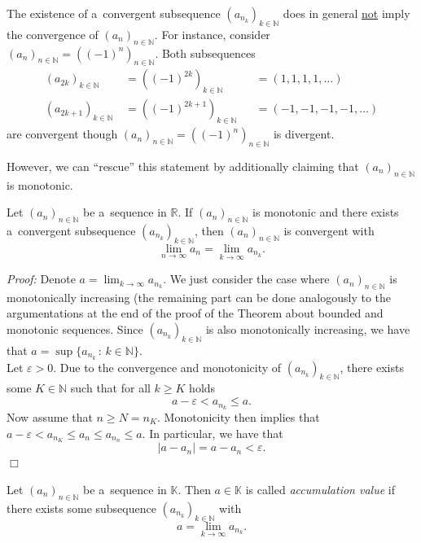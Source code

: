\begin{Attention}{}
The existence of a~convergent subsequence $(a_{n_k})_{k\in\mathbb{N}}$ does in general \underline{not} imply the convergence of $(a_n)_{n\in\mathbb{N}}$. For instance, consider $(a_n)_{n\in\mathbb{N}}=((-1)^n)_{n\in\mathbb{N}}$. Both subsequences
\[\begin{aligned}
(a_{2k})_{k\in\mathbb{N}}\,&=((-1)^{2k})_{k\in\mathbb{N}}&&=(1,1,1,1,\ldots)\\
(a_{2k+1})_{k\in\mathbb{N}}\,&=((-1)^{2k+1})_{k\in\mathbb{N}}\!\!\!\!\!\!&&=(-1,-1,-1,-1,\ldots)
  \end{aligned}
\]
 are convergent though $(a_n)_{n\in\mathbb{N}}=((-1)^n)_{n\in\mathbb{N}}$ is divergent.
\end{Attention}
However, we can ``rescue'' this statement by additionally claiming that $(a_n)_{n\in\mathbb{N}}$ is monotonic.

\begin{Theorem}
\label{thm:submon}
Let $(a_n)_{n\in\mathbb{N}}$ be a~sequence in $\mathbb{R}$. If $(a_n)_{n\in\mathbb{N}}$ is monotonic and there exists a~convergent subsequence $(a_{n_k})_{k\in\mathbb{N}}$, then $(a_n)_{n\in\mathbb{N}}$ is convergent with
\[\lim_{n\to\infty}a_n=\lim_{k\to\infty}a_{n_k}.\]
\end{Theorem}

{\em Proof:} Denote $a=\lim_{k\to\infty}a_{n_k}$. We just consider the case where $(a_n)_{n\in\mathbb{N}}$ is monotonically increasing 
(the remaining part can be done analogously to the argumentations at the end of the proof of the Theorem about bounded and monotonic sequences. 
Since $(a_{n_k})_{k\in\mathbb{N}}$ is also monotonically increasing, we have that $a=\sup\{a_{n_k}\,:\,k\in\mathbb{N}\}$. \\
Let $\varepsilon>0$. Due to the convergence and monotonicity of $(a_{n_k})_{k\in\mathbb{N}}$, there exists some $K\in\mathbb{N}$ such that for all $k\geq K$ holds
\[a-\varepsilon<a_{n_k}\leq a.\]
Now assume that $n\geq N=n_K$. Monotonicity then implies that $a-\varepsilon<a_{n_K}\leq a_n\leq a_{n_n}\leq a$. In particular, we have that
\[|a- a_n|=a-a_n<\varepsilon.\]\hfill$\Box$


\begin{Definition}
\label{def:accuPointNormedSpace}
Let $(a_n)_{n\in\mathbb{N}}$ be a~sequence in $\mathbb{K}$. Then $a\in \mathbb{K}$ is called \emph{accumulation value} if there exists some subsequence $(a_{n_k})_{k\in\mathbb{N}}$ with
\[a=\lim_{k\to\infty}a_{n_k}.\]
\end{Definition}

